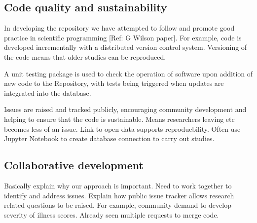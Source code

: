 \documentclass{bioinfo}
\begin{document}
\begin{methods}

\subsection{Code quality and sustainability}

In developing the repository we have attempted to follow and promote good practice in scientific programming [Ref: G Wilson paper]. For example, code is developed incrementally with a distributed version control system. Versioning of the code means that older studies can be reproduced.

A unit testing package is used to check the operation of software upon addition of new code to the Repository, with tests being triggered when updates are integrated into the database.

Issues are raised and tracked publicly, encouraging community development and helping to ensure that the code is sustainable. Means researchers leaving etc becomes less of an issue. Link to open data supports reproducbility. Often use Jupyter Notebook to create database connection to carry out studies.

\subsection{Collaborative development}



Basically explain why our approach is important. Need to work together to identify  and address issues. Explain how public issue tracker allows research related questions to be raised. For example, community demand to develop severity of illness scores. Already seen multiple requests to merge code.


\end{methods}
\end{document}
